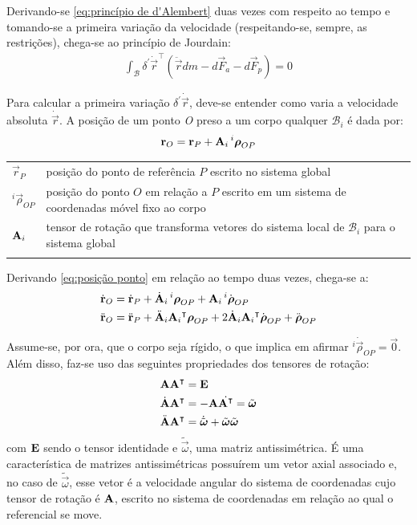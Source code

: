Derivando-se \eqref{eq:princípio de d'Alembert} duas vezes com respeito ao tempo e tomando-se a primeira variação da velocidade (respeitando-se, sempre, as restrições), chega-se ao princípio de Jourdain:
\begin{align}
 \int_\mathcal{B}{\delta^{\prime}\dot{\vec{r}}}^\intercal(\ddot{\vec{r}}dm - d\vec{F}_a -d\vec{F}_p) = 0 \label{eq:Princípio de Jourdain}
\end{align}

Para calcular a primeira variação $\delta^\prime\dot{\vec{r}}$, deve-se entender como varia a velocidade absoluta $\dot{\vec{r}}$. A posição de um ponto \textit{O} preso a um corpo qualquer $\mathcal{B}_i$ é dada por:
\begin{align}
 \boldsymbol{\mathrm{r}}_O = \boldsymbol{\mathrm{r}}_P + \boldsymbol{\mathrm{A}}_i\,^{i}\boldsymbol{\mathrm{\rho}}_{OP} \label{eq:posição ponto}
\end{align}
\begin{tabular}{ll}
 $\vec{r}_P$ & posição do ponto de referência $P$ escrito no sistema global \\
 $^i\vec{\rho}_{OP}$ & posição do ponto $O$ em relação a $P$ escrito em um sistema de coordenadas móvel fixo ao corpo \\
 $\boldsymbol{\mathrm{A}}_i$ & tensor de rotação que transforma vetores do sistema local de $\mathcal{B}_i$ para o sistema global\\
 &
\end{tabular}

Derivando \eqref{eq:posição ponto} em relação ao tempo duas vezes, chega-se a:
\begin{align}
 \dot{\boldsymbol{\mathrm{r}}}_O &= \dot{\boldsymbol{\mathrm{r}}}_P + \dot{\boldsymbol{\mathrm{A}}}_i\,^{i}\boldsymbol{\mathrm{\rho}}_{OP} + \boldsymbol{\mathrm{A}}_i\,^{i}\dot{\boldsymbol{\mathrm{\rho}}}_{OP} 
 \label{eq:velocidade ponto} \\
 \ddot{\boldsymbol{\mathrm{r}}}_O &= \ddot{\boldsymbol{\mathrm{r}}}_P + \ddot{\boldsymbol{\mathrm{A}}}_i{\boldsymbol{\mathrm{A}}_i}^\intercal\boldsymbol{\mathrm{\rho}}_{OP} + 2\dot{\boldsymbol{\mathrm{A}}}_i{\boldsymbol{\mathrm{A}}_i}^\intercal\dot{\boldsymbol{\mathrm{\rho}}}_{OP} + \ddot{\boldsymbol{\mathrm{\rho}}}_{OP} \label{eq:aceleração ponto}
\end{align}

Assume-se, por ora, que o corpo seja rígido, o que implica em afirmar $^i\dot{\vec{\rho}}_{OP} = \vec{0}$. Além disso, faz-se uso das seguintes propriedades dos tensores de rotação:
\begin{align}
 \boldsymbol{\mathrm{A}}\boldsymbol{\mathrm{A}}^\intercal &= \boldsymbol{\mathrm{E}} \\
 \dot{\boldsymbol{\mathrm{A}}}\boldsymbol{\mathrm{A}}^\intercal &= -\boldsymbol{\mathrm{A}}\dot{\boldsymbol{\mathrm{A}}^\intercal} = \tilde{\boldsymbol{\mathrm{\omega}}} \\
 \ddot{\boldsymbol{\mathrm{A}}}\boldsymbol{\mathrm{A}}^\intercal &= \dot{\tilde{\boldsymbol{\mathrm{\omega}}}} + \tilde{\boldsymbol{\mathrm{\omega}}}\tilde{\boldsymbol{\mathrm{\omega}}}
\end{align}
com $\boldsymbol{\mathrm{E}}$ sendo o tensor identidade e $\tilde{\vec{\omega}}$, uma matriz antissimétrica. É uma característica de matrizes antissimétricas possuírem um vetor axial associado e, no caso de $\tilde{\vec{\omega}}$, esse vetor é a velocidade angular do sistema de coordenadas cujo tensor de rotação é $\boldsymbol{\mathrm{A}}$, escrito no sistema de coordenadas em relação ao qual o referencial se move.

